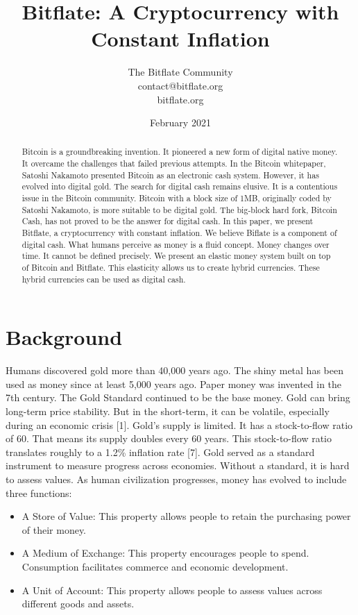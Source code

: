 \documentclass{article}      %
\title{Bitflate: A Cryptocurrency with Constant Inflation}
\author{The Bitflate Community \\ contact@bitflate.org \\ bitflate.org}
\date{February 2021}
\begin{document}

\maketitle                   %

\begin{abstract}
Bitcoin is a groundbreaking invention. It pioneered a new form of digital native money. It overcame the challenges that failed previous attempts. In the Bitcoin whitepaper, Satoshi Nakamoto presented Bitcoin as an electronic cash system. However, it has evolved into digital gold. The search for digital cash remains elusive. It is a contentious issue in the Bitcoin community. Bitcoin with a block size of 1MB, originally coded by Satoshi Nakamoto, is more suitable to be digital gold. The big-block hard fork, Bitcoin Cash, has not proved to be the answer for digital cash. In this paper, we present Bitflate, a cryptocurrency with constant inflation. We believe Biflate is a component of digital cash. What humans perceive as money is a fluid concept. Money changes over time. It cannot be defined precisely. We present an elastic money system built on top of Bitcoin and Bitflate. This elasticity allows us to create hybrid currencies. These hybrid currencies can be used as digital cash.
\end{abstract}

\section{Background}
Humans discovered gold more than 40,000 years ago. The shiny metal has been used as money since at least 5,000 years ago. Paper money was invented in the 7th century. The Gold Standard continued to be the base money. Gold can bring long-term price stability. But in the short-term, it can be volatile, especially during an economic crisis [1]. Gold's supply is limited. It has a stock-to-flow ratio of 60. That means its supply doubles every 60 years. This stock-to-flow ratio translates roughly to a 1.2\% inflation rate [7]. Gold served as a standard instrument to measure progress across economies. Without a standard, it is hard to assess values. As human civilization progresses, money has evolved to include three functions:

\begin{itemize}
   \item A Store of Value: This property allows people to retain the purchasing power of their money.

   \item A Medium of Exchange: This property encourages people to spend. Consumption facilitates commerce and economic development.

   \item A Unit of Account: This property allows people to assess values across different goods and assets.
\end{itemize}
\end{document}
